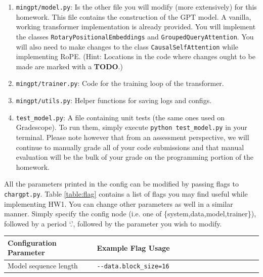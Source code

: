 \documentclass[11pt,addpoints,answers]{exam}
\begin{document}
\begin{questions}
\begin{enumerate}
    \item \lstinline{mingpt/model.py}: Is the other file you will modify (more extensively) for this homework. This file contains the construction of the GPT model. A vanilla, working transformer implementation is already provided. You will implement the classes \lstinline{RotaryPositionalEmbeddings} and \lstinline{GroupedQueryAttention}. You will also need to make changes to the class \lstinline{CausalSelfAttention} while implementing RoPE. (Hint: Locations in the code where changes ought to be made are marked with a \textbf{TODO}.)

    \item \lstinline{mingpt/trainer.py}: Code for the training loop of the transformer.
    
    \item \lstinline{mingpt/utils.py}: Helper functions for saving logs and configs.

    \item \lstinline{test_model.py}: A file containing unit tests (the same ones used on Gradescope). To run them, simply execute \lstinline{python test_model.py} in your terminal. Please note however that from an assessment perspective, we will continue to manually grade all of your code submissions and that manual evaluation will be the bulk of your grade on the programming portion of the homework. 
    
\end{enumerate}

All the parameters printed in the config can be modified by passing flags to \lstinline{chargpt.py}. Table \ref{table:flag} contains a list of flags you may find useful while implementing HW1. You can change other parameters as well in a similar manner. Simply specify the config node (i.e. one of \{system,data,model,trainer\}), followed by a period `.', followed by the parameter you wish to modify.

\begin{table}[h!]
\centering
\begin{tabular}{|p{0.35\linewidth}|p{0.65\linewidth}|}
\hline
Configuration Parameter & Example Flag Usage \\ \hline
Model sequence length &  \lstinline|--data.block_size=16|


\end{tabular}
\end{table}
\end{questions}
\end{document}
